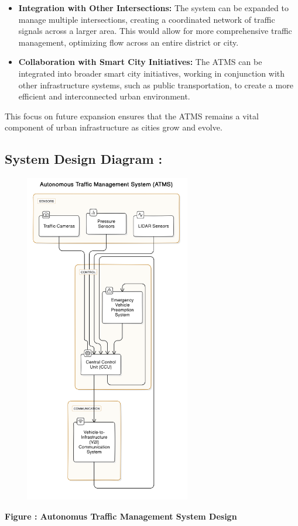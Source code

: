 \documentclass{scrreprt}
\begin{document}
\begin{itemize}
    \item \textbf{Integration with Other Intersections:} 
    The system can be expanded to manage multiple intersections, creating a coordinated network of traffic signals across a larger area. This would allow for more comprehensive traffic management, optimizing flow across an entire district or city.

    \item \textbf{Collaboration with Smart City Initiatives:} 
    The ATMS can be integrated into broader smart city initiatives, working in conjunction with other infrastructure systems, such as public transportation, to create a more efficient and interconnected urban environment.
\end{itemize}

This focus on future expansion ensures that the ATMS remains a vital component of urban infrastructure as cities grow and evolve.

\subsection*{System Design Diagram : }
\begin{center}
    {\includegraphics[width=350px, height=550px]{e.png}}
    \parbox{0.8\textwidth}{ 
        \centering
        \textbf{Figure : Autonomus Traffic Management System Design}
    }
\end{center}
\end{document}
